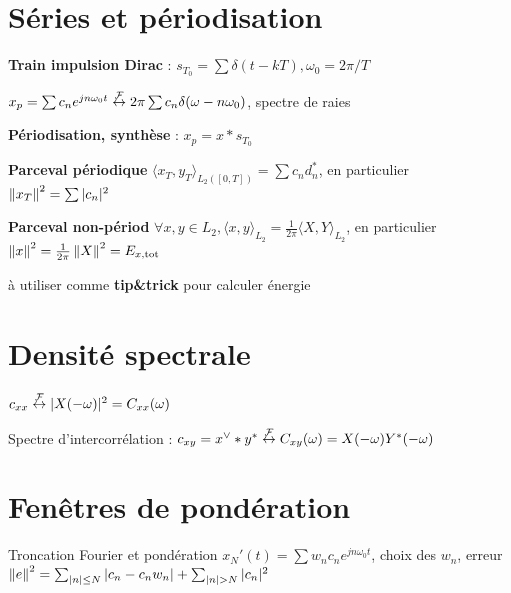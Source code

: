 \section{Séries et périodisation}
\begin{myitemize}

\item \textbf{Train impulsion Dirac} : $s_{T_0} = \sum \delta(t - kT), \omega_0 = 2\pi / T$

\item $x_p = \sum c_n e^{jn\omega_0 t} \stackrel{\mathcal{F}}{\leftrightarrow} 2\pi \sum c_n \delta(\omega - n\omega_0)$, spectre de raies

\item \textbf{Périodisation, synthèse} : $x_p = x * s_{T_0}$

\item \textbf{Parceval périodique} $\langle x_T,y_T \rangle_{L_2([0,T])} = \sum c_n d_n^*$, en particulier $\left\lVert x_T\right\rVert^2 = \sum |c_n|^2$

\item \textbf{Parceval non-périod} $\forall x,y \in L_2, \langle x,y \rangle_{L_2} = \frac{1}{2\pi}\langle X, Y \rangle_{L_2} $, en particulier $\left\lVert x\right\rVert^2 = \frac{1}{2\pi} \left\lVert X\right\rVert^2 = E_{x,\text{tot}}$

à utiliser comme \textbf{tip\&trick} pour calculer énergie

\end{myitemize}


\section{Densité spectrale}

$c_{xx} \stackrel{\mathcal{F}}{\leftrightarrow} |X(-\omega)|^2 = C_{xx}(\omega)$

Spectre d'intercorrélation : $c_{xy} = x^\vee * y^* \stackrel{\mathcal{F}}{\leftrightarrow} C_{xy}(\omega) = X(-\omega) Y^*(-\omega)$



\section{Fenêtres de pondération}

Troncation Fourier et pondération $x_N'(t) = \sum w_n c_n e^{jn\omega_0t}$, choix des $w_n$, erreur $\left\lVert e\right\rVert^2 = \sum_{|n| \leq N} |c_n - c_nw_n| + \sum_{|n| > N} |c_n|^2$


